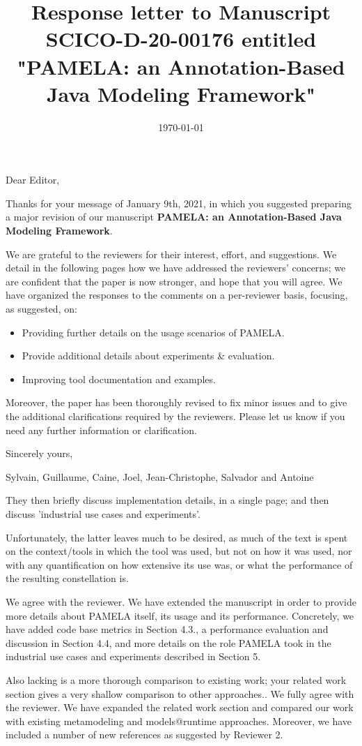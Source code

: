 \documentclass[10pt]{article}
\title{Response letter to Manuscript SCICO-D-20-00176 entitled "PAMELA: an Annotation-Based Java Modeling Framework"}
\date{\today}
\begin{document}
Dear Editor,

\bigskip
Thanks for your message of January 9th, 2021, in which you suggested preparing a major revision of our manuscript  \textbf{PAMELA: an Annotation-Based Java Modeling Framework}. 

\bigskip
We are grateful to the reviewers for their interest, effort, and suggestions. We detail in the following pages how we have addressed the reviewers' concerns; we are confident that the paper is now stronger, and hope that you will agree. We have organized the responses to the comments on a per-reviewer basis, focusing, as suggested, on: 

\begin{itemize}
\item Providing further details on the usage scenarios of PAMELA.
\item Provide additional details about experiments \& evaluation.
\item Improving tool documentation and examples.
\end{itemize}

Moreover, the paper has been thoroughly revised to fix minor issues and to give the additional clarifications required by the reviewers. Please let us know if you need any further information or clarification.

\bigskip
Sincerely yours,

\bigskip
Sylvain, Guillaume, Caine, Joel, Jean-Christophe, Salvador and Antoine

\pagebreak


\begin{response}{They then briefly discuss implementation details, in a single page; and then discuss 'industrial use cases and experiments'.

Unfortunately, the latter leaves much to be desired, as much of the text is spent on the context/tools in which the tool was used, but not on how it was used, nor with any quantification on how extensive its use was, or what the performance of the resulting constellation is.
} We agree with the reviewer. We have extended the manuscript in order to provide more details about PAMELA itself, its usage and its performance. Concretely, we have added code base metrics in Section 4.3., a performance evaluation and discussion in Section 4.4, and more details on the role PAMELA took in the industrial use cases and experiments described in Section 5.
\end{response}

\begin{response}{Also lacking is a more thorough comparison to existing work; your related work section gives a very shallow comparison to other approaches..}
We fully agree with the reviewer. We have expanded the related work section and compared our work with existing metamodeling and models@runtime approaches. Moreover, we have included a number of new references as suggested by Reviewer 2.
\end{response}
\end{document}
